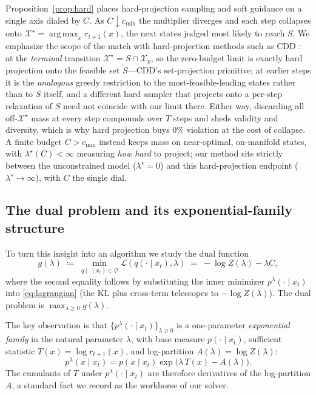 \documentclass{article}
\DeclareMathOperator*{\argmax}{arg\,max}
\newcommand{\X}{\mathcal{X}}
\newcommand{\Q}{\mathcal{Q}}
\newcommand{\lstar}{\lambda^{\star}}
\newcommand{\qlam}{p^{\lambda}(\cdot\mid x_t)}
\begin{document}
Proposition~\ref{prop:hard} places hard-projection sampling and soft guidance on a single axis dialed by $C$. As $C\downarrow c_{\min}$ the multiplier diverges and each step collapses onto $\X^\star=\argmax_x r_{t+1}(x)$, the next states judged most likely to reach $S$. We emphasize the scope of the match with hard-projection methods such as CDD \cite{cardei2025cdd}: at the \emph{terminal} transition $\X^\star=S\cap\X_p$, so the zero-budget limit is exactly hard projection onto the feasible set $S$---CDD's set-projection primitive; at earlier steps it is the \emph{analogous} greedy restriction to the most-feasible-leading states rather than to $S$ itself, and a different hard sampler that projects onto a per-step relaxation of $S$ need not coincide with our limit there. Either way, discarding all off-$\X^\star$ mass at every step compounds over $T$ steps and sheds validity and diversity, which is why hard projection buys $0\%$ violation at the cost of collapse. A finite budget $C>c_{\min}$ instead keeps mass on near-optimal, on-manifold states, with $\lstar(C)<\infty$ measuring \emph{how hard} to project; our method sits strictly between the unconstrained model ($\lstar=0$) and this hard-projection endpoint ($\lstar\to\infty$), with $C$ the single dial.

\subsection{The dual problem and its exponential-family structure}
To turn this insight into an algorithm we study the dual function
\begin{equation}
\label{eq:dual}
g(\lambda)\;\coloneqq\;\min_{q(\cdot\mid x_t)\in\Q}\mathcal L(q(\cdot\mid x_t),\lambda)
\;=\;-\log Z(\lambda)-\lambda C,
\end{equation}
where the second equality follows by substituting the inner minimizer $\qlam$ into \eqref{eq:lagrangian} (the KL plus cross-term telescopes to $-\log Z(\lambda)$). The dual problem is $\max_{\lambda\ge 0} g(\lambda)$.

The key observation is that $\{\qlam\}_{\lambda\ge0}$ is a one-parameter \emph{exponential family} in the natural parameter $\lambda$, with base measure $p(\cdot\mid x_t)$, sufficient statistic $T(x)=\log r_{t+1}(x)$, and log-partition $A(\lambda)=\log Z(\lambda)$:
\begin{equation}
p^{\lambda}(x\mid x_t)=p(x\mid x_t)\exp\!\big(\lambda\,T(x)-A(\lambda)\big).
\end{equation}
The cumulants of $T$ under $\qlam$ are therefore derivatives of the log-partition $A$, a standard fact we record as the workhorse of our solver.
\end{document}
